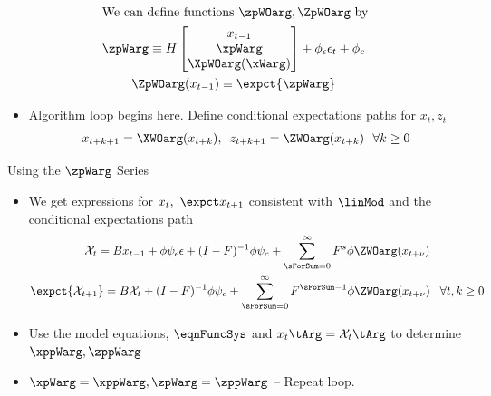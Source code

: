 \documentclass[12pt]{article}
\begin{document}
\begin{gather*}
 \intertext{We can define functions $\zpWOarg,\ZpWOarg$ by}
\zpWarg\equiv H
\begin{bmatrix}
x_{t-1}\\ \xpWarg\\ \XpWOarg(\xWarg)
\end{bmatrix}+\phi_\epsilon \epsilon_t+\phi_c\\
\ZpWOarg(x_{t-1})\equiv \expct{\zpWarg}
\end{gather*}
 \begin{itemize}
\item  {\color{blue}Algorithm loop begins here.} Define conditional expectations paths for $x_t, z_t$ 
 \begin{gather*}
 x_{t+k+1}=\XWOarg(x_{t+k}),\,\,\,z_{t+k+1}=\ZWOarg(x_{t+k})\,\,\,\,  \forall k\ge 0      \end{gather*}
   \end{itemize}

{Using the $\zpWarg$ Series}
{\small
  \begin{itemize}
  \item We get expressions for $x_t,\,\, \expct x_{t+1}$ consistent with $\linMod$ and the conditional expectations path
   \begin{gather*}
     \mathcal{X}_{t} =B x_{t-1}+ \phi \psi_\epsilon\epsilon + (I - F)^{-1} \phi \psi_c + \sum_{\sForSum=0}^\infty F^s \phi \ZWOarg(x_{t+\nu})\\
	\expct{ \mathcal{X}_{t+1}} =B \mathcal{X}_{t}  + (I - F)^{-1} \phi \psi_c+ \sum_{\sForSum =0}^\infty F^{\sForSum-1} \phi \ZWOarg(x_{t+\nu}) \,\,\,\,\,\forall t,k \ge  0
\end{gather*}
\item Use the model equations, $\eqnFuncSys$ and $x_t\tArg=\mathcal{X}_t\tArg$ to determine $\xppWarg, \zppWarg$
\item $\xpWarg=\xppWarg, \zpWarg=\zppWarg$ -- {\color{blue}Repeat loop.}
  \end{itemize}
}


\end{document}
